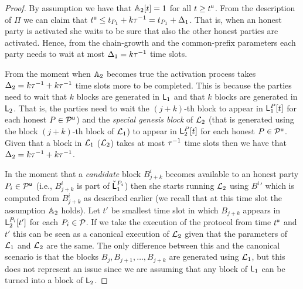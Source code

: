 \begin{proof}

By assumption we have that $\mathbb{A}_2[t]=1$ for all $t\geq t^{\mathsf{u}}$. From the description of $\Pi$ we can claim that $t^{\mathsf{u}} \leq t_{P_1}+k\tau^{-1}=t_{P_1}+\Delta_1$.
That is, when an honest party is activated she waits to be sure that also the other honest parties are activated. Hence, from the chain-growth and the common-prefix parameters
each party needs to wait at most $\Delta_1=k\tau^{-1}$ time slots.

From the moment when $\mathbb{A}_2$ becomes true the activation process takes $\Delta_2=k \tau^{-1} + k \tau^{-1}$  time slots more to be completed.
This is because the parties need to wait that $k$ blocks are generated in $\mathsf{L}_1$ and that $k$ blocks are generated in $\mathsf{L}_2$. 
That is, the parties need to wait the $(j+k)$-th block to appear in $\mathsf{L}_1^P[t]$ for each honest $P\in\mathcal{P}^\mathsf{u}$) and the \emph{special genesis block} of $\mathcal{L}_2$ (that is generated using the block $(j+k)$-th block of $\mathcal{L}_1$) to appear 
in $\mathsf{L}_2^P[t]$ for each honest $P\in\mathcal{P}^\mathsf{u}$. Given that a block in $\mathcal{L}_1$ ($\mathcal{L}_2$) takes at most $\tau^{-1}$ time slots then we have that $\Delta_2=k \tau^{-1} + k \tau^{-1}$.


In the moment that a \emph{candidate} block $B^i_{j+k}$ becomes available to an honest party $P_i\in\mathcal{P}^\mathsf{u}$ (i.e., $B^i_{j+k}$ is part of $\check {\mathsf{L}}_1^{P_i}$) then she starts running $\mathcal{L}_2$
using ${B^i}'$ which is computed from $B^i_{j+k}$ as described earlier (we recall that at this time slot the assumption $\mathbb{A}_2$ holds).
Let $t'$ be smallest time slot in which $B_{j+k}$ appears in $\mathsf{L}_2^{P_i}[t']$ for each $P_i\in\mathcal{P}$.
If we take the execution of the protocol from time $t^{\mathsf{u}}$ and $t'$ this can be seen as a canonical execution of $\mathcal{L}_2$ given
that the parameters of $\mathcal{L}_1$ and $\mathcal{L}_2$ are the same. The only difference between this and the canonical scenario is
that the blocks $B_{j}, B_{j+1},\dots, B_{j+k}$ are generated using $\mathcal{L}_1$, but this does not represent an issue since we are assuming that
any block of $\mathsf{L}_1$ can be turned into a block of $\mathsf{L}_2$. \end{proof}

